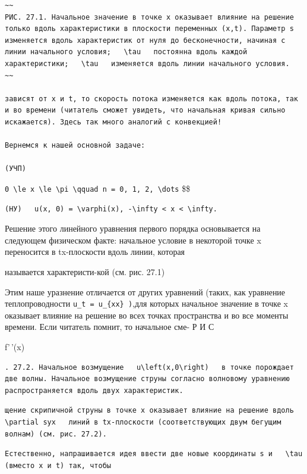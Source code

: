 \documentclass[
  ukrainian,
]{article}
\begin{document}
\begin{verbatim}
~~
РИС. 27.1. Начальное значение в точке x оказывает влияние на решение только вдоль характеристики в плоскости переменных (x,t). Параметр s изменяется вдоль характеристик от нуля до бесконечности, начиная с линии начального условия;   \tau   постоянна вдоль каждой характеристики;   \tau   изменяется вдоль линии начального условия.
~~

зависят от x и t, то скорость потока изменяется как вдоль потока, так и во времени (читатель сможет увидеть, что начальная кривая сильно искажается). Здесь так много аналогий с конвекцией!

Вернемся к нашей основной задаче:

(УЧП)
\end{verbatim}

\texttt{0\ \textbackslash{}le\ x\ \textbackslash{}le\ \textbackslash{}pi\ \textbackslash{}qquad\ n\ =\ 0,\ 1,\ 2,\ \textbackslash{}dots}
\$\$

\begin{verbatim}
(НУ)   u(x, 0) = \varphi(x), -\infty < x < \infty.
\end{verbatim}

Решение этого линейного уравнения первого порядка основывается на
следующем физическом факте: начальное условие в некоторой точке x
переносится в tx-плоскости вдоль линии, которая

называется характеристи-кой (см. рис. 27.1)

Этим наше уразнение отличается от других уравнений (таких, как уравнение
теплопроводности \texttt{u\_t\ =\ u\_\{xx\}\ )},для которых начальное
значение в точке x оказывает влияние на решение во всех точках
пространства и во все моменты времени. Если читатель помнит, то
начальное сме- Р И С

f'\,'(x)

\begin{verbatim}
. 27.2. Начальное возмущение   u\left(x,0\right)   в точке порождает две волны. Начальное возмущение струны согласно волновому уравнению распространяется вдоль двух характеристик.
\end{verbatim}

\begin{verbatim}
щение скрипичной струны в точке x оказывает влияние на решение вдоль   \partial syx   линий в tx-плоскости (соответствующих двум бегущим волнам) (см. рис. 27.2).
\end{verbatim}

\begin{verbatim}
Естественно, напрашивается идея ввести две новые координаты s и   \tau   (вместо x и t) так, чтобы
\end{verbatim}
\end{document}
